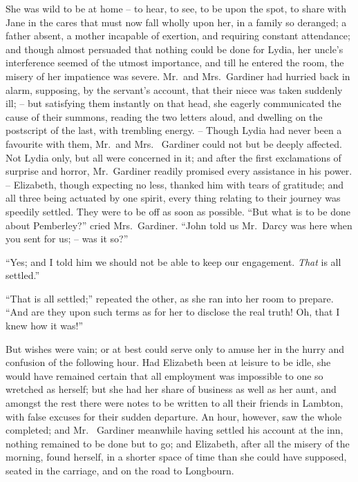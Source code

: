 She was wild to be at home -- to hear, to see, to be
upon the spot, to share with Jane in the cares that must
now fall wholly upon her, in a family so deranged; a father
absent, a mother incapable of exertion, and requiring
constant attendance; and though almost persuaded that
nothing could be done for Lydia, her uncle’s interference
seemed of the utmost importance, and till he entered the
room, the misery of her impatience was severe. Mr.\ and
Mrs.\ Gardiner had hurried back in alarm, supposing, by
the servant’s account, that their niece was taken suddenly
ill; -- but satisfying them instantly on that head, she
eagerly communicated the cause of their summons,
reading the two letters aloud, and dwelling on the postscript
of the last, with trembling energy. -- Though Lydia
had never been a favourite with them, Mr.\ and Mrs.\ %
Gardiner could not but be deeply affected. Not Lydia
only, but all were concerned in it; and after the first
exclamations of surprise and horror, Mr.\ Gardiner readily
promised every assistance in his power. -- Elizabeth,
though expecting no less, thanked him with tears of
gratitude; and all three being actuated by one spirit,
every thing relating to their journey was speedily settled.
They were to be off as soon as possible. “But what is
to be done about Pemberley?” cried Mrs.\ Gardiner.
“John told us Mr.\ Darcy was here when you sent for
us; -- was it so?”

“Yes; and I told him we should not be able to keep
our engagement. \textit{That} is all settled.”

“That is all settled;” repeated the other, as she ran
into her room to prepare. “And are they upon such
terms as for her to disclose the real truth! Oh, that
I knew how it was!”

But wishes were vain; or at best could serve only to
amuse her in the hurry and confusion of the following
hour. Had Elizabeth been at leisure to be idle, she
would have remained certain that all employment was
impossible to one so wretched as herself; but she had
her share of business as well as her aunt, and amongst
the rest there were notes to be written to all their friends
in Lambton, with false excuses for their sudden departure.
An hour, however, saw the whole completed; and Mr.\ %
Gardiner meanwhile having settled his account at the inn,
nothing remained to be done but to go; and Elizabeth,
after all the misery of the morning, found herself, in
a shorter space of time than she could have supposed,
seated in the carriage, and on the road to Longbourn.

